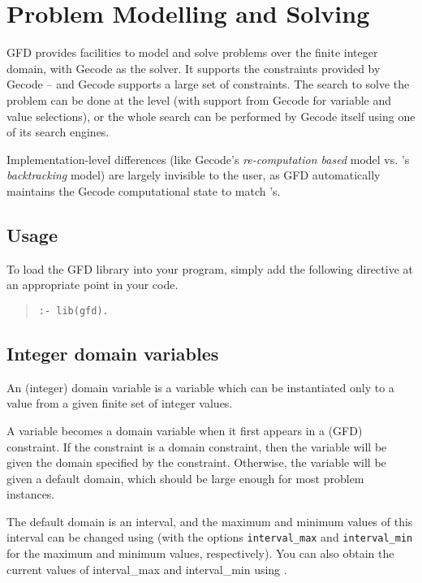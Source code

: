 \section{Problem Modelling and Solving}

GFD provides facilities to model and solve problems over the 
finite integer domain, with Gecode as the solver. It supports the constraints
provided by Gecode -- and Gecode supports a large set of constraints. The 
search to solve the problem can be done at the 
{\eclipse} level (with support from Gecode for variable and value selections), 
or the whole search can be performed by Gecode itself using one of its 
search engines.   

Implementation-level differences (like Gecode's 
{\it re-computation based\/} model vs. \eclipse's {\it backtracking\/}
model) are largely invisible to the user,
as GFD automatically maintains the Gecode computational state 
to match \eclipse's.

\subsection{Usage}

To load the GFD library into your program, simply add the following directive
at an appropriate point in your code.

\begin{quote}
\begin{verbatim}
:- lib(gfd).
\end{verbatim}
\end{quote}

\subsection{Integer domain variables}

An (integer) domain variable is a variable which can be instantiated only to a
value from a given finite set of integer values. 

A variable becomes a domain variable when it first appears in a (GFD) 
constraint. If the constraint is a domain constraint, then the variable will
be given the domain specified by the constraint. Otherwise, the variable will
be given a default domain, which should be large enough for
most problem instances. 

The default domain is an interval, and the maximum and minimum values of this
interval can be changed using  (with the options 
{\tt interval_max} and {\tt interval_min} for the maximum and minimum values,
respectively).  You can also obtain the current values
of interval_max and interval_min using .

